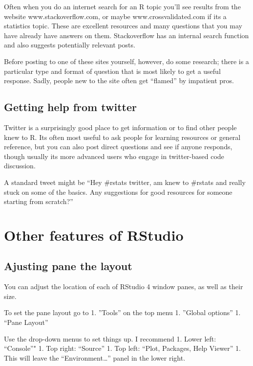 \documentclass[
]{book}
\begin{document}
Often when you do an internet search for an R topic you'll see results from the website www.stackoverflow.com, or maybe www.crossvalidated.com if its a statistics topic. These are excellent resources and many questions that you may have already have answers on them. Stackoverflow has an internal search function and also suggests potentially relevant posts.

Before posting to one of these sites yourself, however, do some research; there is a particular type and format of question that is most likely to get a useful response. Sadly, people new to the site often get ``flamed'' by impatient pros.

\hypertarget{getting-help-from-twitter}{%
\subsection{Getting help from twitter}\label{getting-help-from-twitter}}

Twitter is a surprisingly good place to get information or to find other people knew to R. Its often most useful to ask people for learning resources or general reference, but you can also post direct questions and see if anyone responds, though usually its more advanced users who engage in twitter-based code discussion.

A standard tweet might be
``Hey \#rstats twitter, am knew to \#rstats and really stuck on some of the basics. Any suggestions for good resources for someone starting from scratch?''

\hypertarget{other-features-of-rstudio}{%
\section{Other features of RStudio}\label{other-features-of-rstudio}}

\hypertarget{ajusting-pane-the-layout}{%
\subsection{Ajusting pane the layout}\label{ajusting-pane-the-layout}}

You can adjust the location of each of RStudio 4 window panes, as well as their size.

To set the pane layout go to
1. ''Tools'' on the top menu
1. ''Global options''
1. ``Pane Layout''

Use the drop-down menus to set things up. I recommend
1. Lower left: ``Console''"
1. Top right: ``Source''
1. Top left: ``Plot, Packages, Help Viewer''
1. This will leave the ``Environment\ldots{}'' panel in the lower right.
\end{document}
